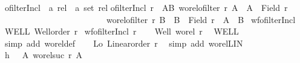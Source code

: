 \begin{isabellebody}
\isamarkuptrue%
%
\endisatagdocument
{\isafolddocument}%
%
\isadelimdocument
%
\endisadelimdocument
{}\isamarkupfalse%
\ ofilterIncl\ {\isacharcolon}{\kern0pt}{\isacharcolon}{\kern0pt}\ {\isachardoublequoteopen}{\isacharprime}{\kern0pt}a\ rel\ {\isasymRightarrow}\ {\isacharprime}{\kern0pt}a\ set\ rel{\isachardoublequoteclose}\isanewline
{}\isanewline
{\isachardoublequoteopen}ofilterIncl\ r\ {\isasymequiv}\ {\isacharbraceleft}{\kern0pt}{\isacharparenleft}{\kern0pt}A{\isacharcomma}{\kern0pt}B{\isacharparenright}{\kern0pt}{\isachardot}{\kern0pt}\ wo{\isacharunderscore}{\kern0pt}rel{\isachardot}{\kern0pt}ofilter\ r\ A\ {\isasymand}\ A\ {\isasymnoteq}\ Field\ r\ {\isasymand}\isanewline
\ \ \ \ \ \ \ \ \ \ \ \ \ \ \ \ \ \ \ \ \ \ \ \ \ wo{\isacharunderscore}{\kern0pt}rel{\isachardot}{\kern0pt}ofilter\ r\ B\ {\isasymand}\ B\ {\isasymnoteq}\ Field\ r\ {\isasymand}\ A\ {\isacharless}{\kern0pt}\ B{\isacharbraceright}{\kern0pt}{\isachardoublequoteclose}\isanewline
\isanewline
{}\isamarkupfalse%
\ wf{\isacharunderscore}{\kern0pt}ofilterIncl{\isacharcolon}{\kern0pt}\isanewline
{}\ WELL{\isacharcolon}{\kern0pt}\ {\isachardoublequoteopen}Well{\isacharunderscore}{\kern0pt}order\ r{\isachardoublequoteclose}\isanewline
{}\ {\isachardoublequoteopen}wf{\isacharparenleft}{\kern0pt}ofilterIncl\ r{\isacharparenright}{\kern0pt}{\isachardoublequoteclose}\isanewline
%
\isadelimproof
%
\endisadelimproof
%
\isatagproof
{}\isamarkupfalse%
{\isacharminus}{\kern0pt}\isanewline
\ \ \isamarkupfalse%
\ Well{\isacharcolon}{\kern0pt}\ {\isachardoublequoteopen}wo{\isacharunderscore}{\kern0pt}rel\ r{\isachardoublequoteclose}\ \isamarkupfalse%
\ WELL\ \isamarkupfalse%
\ {\isacharparenleft}{\kern0pt}simp\ add{\isacharcolon}{\kern0pt}\ wo{\isacharunderscore}{\kern0pt}rel{\isacharunderscore}{\kern0pt}def{\isacharparenright}{\kern0pt}\isanewline
\ \ \isamarkupfalse%
\ Lo{\isacharcolon}{\kern0pt}\ {\isachardoublequoteopen}Linear{\isacharunderscore}{\kern0pt}order\ r{\isachardoublequoteclose}\ \isamarkupfalse%
\ {\isacharparenleft}{\kern0pt}simp\ add{\isacharcolon}{\kern0pt}\ wo{\isacharunderscore}{\kern0pt}rel{\isachardot}{\kern0pt}LIN{\isacharparenright}{\kern0pt}\isanewline
\ \ \isamarkupfalse%
\ {\isacharquery}{\kern0pt}h\ {\isacharequal}{\kern0pt}\ {\isachardoublequoteopen}{\isacharparenleft}{\kern0pt}{\isasymlambda}\ A{\isachardot}{\kern0pt}\ wo{\isacharunderscore}{\kern0pt}rel{\isachardot}{\kern0pt}suc\ r\ A{\isacharparenright}{\kern0pt}{\isachardoublequoteclose}\isanewline

\end{isabellebody}
